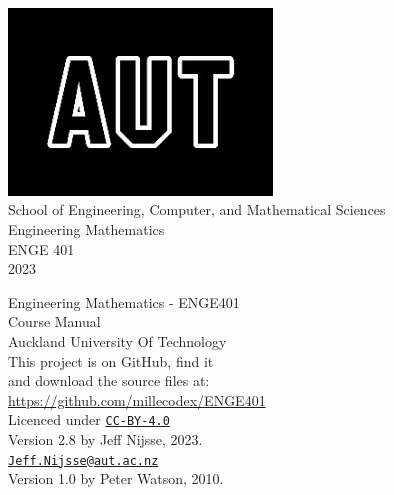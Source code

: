 \documentclass[a4paper,11pt,openany,twoside,hidelinks]{book}
\begin{document}
\frontmatter
\begin{titlepage}
\begin{center}
\includegraphics[width=7cm]{AUTlogo}\\
{\vspace{2cm}}
 {\Large School of Engineering, Computer, and Mathematical Sciences}
 \vspace{3cm}\\
 {\huge Engineering Mathematics}\\
 \vspace{1cm}
{\huge ENGE 401} \\
 \vspace{1cm}
{\huge 2023} \\
 \vfill
\end{center}
\end{titlepage}

\clearpage\thispagestyle{empty}
\vspace*{\fill}
Engineering Mathematics - ENGE401\\
Course Manual\\
Auckland University Of Technology\\

This project is on GitHub, find it \\
and download the source files at: \\
\url{https://github.com/millecodex/ENGE401} \\

Licenced under \href{https://creativecommons.org/licenses/by/4.0/}{\texttt{CC-BY-4.0}}\\

Version 2.8 by Jeff Nijsse, 2023.\\
\href{mailto:Jeff.Nijsse@aut.ac.nz}{\texttt{Jeff.Nijsse@aut.ac.nz}}\\
Version 1.0 by Peter Watson, 2010.

\clearpage
{}

\afterpage{\null\newpage}

%
\tableofcontents
\mainmatter








%
\end{document}
